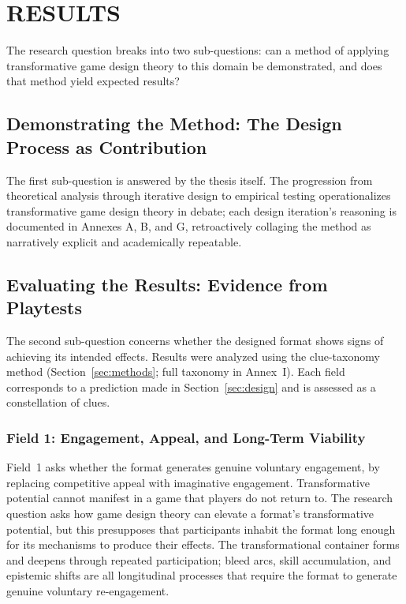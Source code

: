 \section{RESULTS}
\label{sec:results}

The research question breaks into two sub-questions: can a method of applying transformative game design theory to this domain be demonstrated, and does that method yield expected results?

\subsection{Demonstrating the Method: The Design Process as Contribution}

The first sub-question is answered by the thesis itself. The progression from theoretical analysis through iterative design to empirical testing operationalizes transformative game design theory in debate; each design iteration's reasoning is documented in Annexes A, B, and G, retroactively collaging the method as narratively explicit and academically repeatable.

\subsection{Evaluating the Results: Evidence from Playtests}

The second sub-question concerns whether the designed format shows signs of achieving its intended effects. Results were analyzed using the clue-taxonomy method (Section~\ref{sec:methods}; full taxonomy in Annex~I). Each field corresponds to a prediction made in Section~\ref{sec:design} and is assessed as a constellation of clues.

\subsubsection{Field 1: Engagement, Appeal, and Long-Term Viability}

Field~1 asks whether the format generates genuine voluntary engagement, by replacing competitive appeal with imaginative engagement. Transformative potential cannot manifest in a game that players do not return to. The research question asks how game design theory can elevate a format's transformative potential, but this presupposes that participants inhabit the format long enough for its mechanisms to produce their effects. The transformational container forms and deepens through repeated participation; bleed arcs, skill accumulation, and epistemic shifts are all longitudinal processes that require the format to generate genuine voluntary re-engagement.

